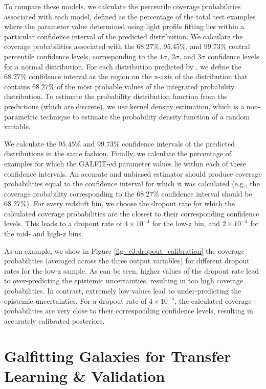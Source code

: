 To compare these models, we calculate the percentile coverage probabilities associated with each model, defined as the percentage of the total test examples where the parameter value determined using light profile fitting lies within a particular confidence interval of the predicted distribution. We calculate the coverage probabilities associated with the $68.27\%$, $95.45\%$, and $99.73\%$ central percentile confidence levels, corresponding to the $1\sigma$, $2\sigma$, and $3\sigma$ confidence levels for a normal distribution. For each distribution predicted by \gampen{}, we define the $68.27\%$ confidence interval as the region on the x-axis of the distribution that contains $68.27\%$ of the most probable values of the integrated probability distribution. To estimate the probability distribution function from the \gampen{} predictions (which are discrete), we use kernel density estimation, which is a non-parametric technique to estimate the probability density function of a random variable. 

We calculate the $95.45\%$ and $99.73\%$ confidence intervals of the predicted distributions in the same fashion. Finally, we calculate the percentage of examples for which the GALFIT-ed parameter values lie within each of these confidence intervals. An accurate and unbiased estimator should produce coverage probabilities equal to the confidence interval for which it was calculated (e.g., the coverage probability corresponding to the $68.27\%$ confidence interval should be $68.27\%$). For every redshift bin, we choose the dropout rate for which the calculated coverage probabilities are the closest to their corresponding confidence levels. This leads to a dropout rate of $4\times10^{-4}$ for the low-z bin, and $2\times10^{-4}$ for the mid- and high-z bins. 

As an example, we show in Figure \ref{fig_c3:dropout_calibration} the coverage probabilities (averaged across the three output variables) for different dropout rates for the low-z sample. As can be seen, higher values of the dropout rate lead to \gampen{} over-predicting the epistemic uncertainties, resulting in too high coverage probabilities. In contrast, extremely low values lead to \gampen{} under-predicting the epistemic uncertainties. For a dropout rate of $4\times10^{-4}$, the calculated coverage probabilities are very close to their corresponding confidence levels, resulting in accurately calibrated posteriors. 


\section{Galfitting Galaxies for Transfer Learning \& Validation} \label{sec_c3:galfitting}

